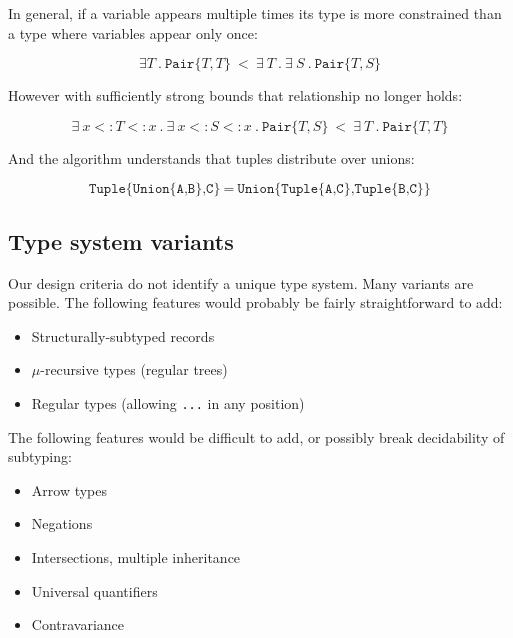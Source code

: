 
\noindent
In general, if a variable appears multiple times its type is more constrained
than a type where variables appear only once:

\vspace{-3ex}
\[
\exists T\ .\ \texttt{Pair}\{T,T\}\ <\ \exists\ T\ .\ \exists\ S\ .\ \texttt{Pair}\{T,S\}
\]

\noindent
However with sufficiently strong bounds that relationship no longer holds:

\vspace{-3ex}
\[
\exists\ x<:T<:x\ .\ \exists\ x<:S<:x\ .\ \texttt{Pair}\{T,S\}\ <\ \exists\ T\ .\ \texttt{Pair}\{T,T\}
\]


\noindent
And the algorithm understands that tuples distribute over unions:

\vspace{-3ex}
\[
\texttt{Tuple\{Union\{A,B\},C\}}\ =\ \texttt{Union\{Tuple\{A,C\},Tuple\{B,C\}\}}
\]

\subsection{Type system variants}

Our design criteria do not identify a unique type system.
Many variants are possible.
The following features would probably be fairly straightforward to add:

\vspace{-3ex}
\begin{singlespace}
\begin{itemize}
\item Structurally-subtyped records
\item $\mu$-recursive types (regular trees)
\item Regular types (allowing \texttt{...} in any position)
\end{itemize}
\end{singlespace}

\noindent
The following features would be difficult to add, or possibly break decidability
of subtyping:

\vspace{-3ex}
\begin{singlespace}
\begin{itemize}
\item Arrow types
\item Negations
\item Intersections, multiple inheritance
\item Universal quantifiers
\item Contravariance
\end{itemize}
\end{singlespace}


